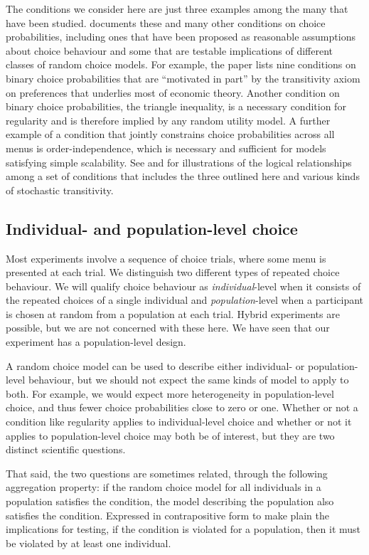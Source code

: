 \documentclass[11pt,letter]{article}
\newcommand{\menu}{menu}
\newcommand{\menus}{menus}
\begin{document}
The conditions we consider here are just three examples among the many that have been studied.
\citet{Fish99} documents these and many other conditions on choice probabilities, including ones that have been proposed as reasonable assumptions about choice behaviour and some that are testable implications of different classes of random choice models.
For example, the paper lists nine conditions on binary choice probabilities that are ``motivated in part'' by the transitivity axiom on preferences that underlies most of economic theory.
Another condition on binary choice probabilities, the triangle inequality, is a necessary condition for regularity and is therefore implied by any random utility model.
A further example of a condition that jointly constrains choice probabilities across all \menus{} is order-independence, which is necessary and sufficient for models satisfying simple scalability.
See \citet{LuceSupp65} and \citet{McCaMarl13} for illustrations of the logical relationships among a set of conditions that includes the three outlined here and various kinds of stochastic transitivity.

\subsection{Individual- and population-level choice}\label{s:aggregation}

Most experiments involve a sequence of choice trials, where some \menu{} is presented at each trial.
We distinguish two different types of repeated choice behaviour.
We will qualify choice behaviour as {\em individual}-level when it consists of the repeated choices of a single individual and {\em population}-level when a participant is chosen at random from a population at each trial.
Hybrid experiments are possible, but we are not concerned with these here.
We have seen that our experiment has a population-level design.

A random choice model can be used to describe either individual- or population-level behaviour, but we should not expect the same kinds of model to apply to both.
For example, we would expect more heterogeneity in population-level choice, and thus fewer choice probabilities close to zero or one.
Whether or not a condition like regularity applies to individual-level choice and whether or not it applies to  population-level choice may both be of interest, but they are two distinct scientific questions.

That said, the two questions are sometimes related, through the following aggregation property: if the random choice model for all individuals in a population satisfies the condition, the model describing the population also satisfies the condition.
Expressed in contrapositive form to make plain the implications for testing, if the condition is violated for a population, then it must be violated by at least one individual.
\end{document}
